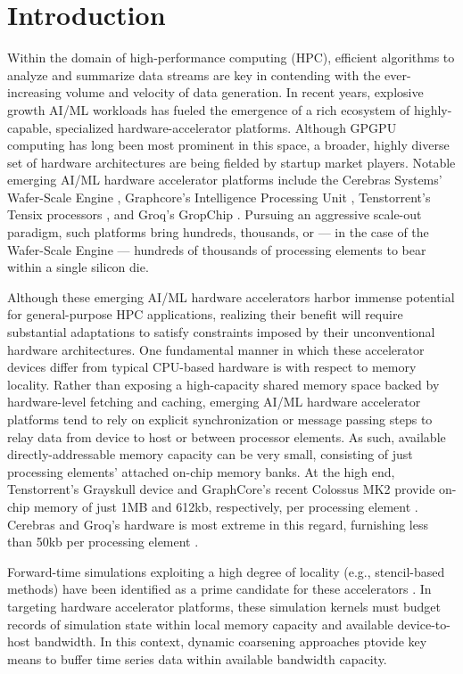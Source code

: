 \section{Introduction} \label{sec:introduction}

Within the domain of high-performance computing (HPC), efficient algorithms to analyze and summarize data streams are key in contending with the ever-increasing volume and velocity of data generation.
In recent years, explosive growth AI/ML workloads has fueled the emergence of a rich ecosystem of highly-capable, specialized hardware-accelerator platforms.
Although GPGPU computing has long been most prominent in this space, a broader, highly diverse set of hardware architectures are being fielded by startup market players.
Notable emerging AI/ML hardware accelerator platforms include the Cerebras Systems' Wafer-Scale Engine \citep{lie2023cerebras}, Graphcore's Intelligence Processing Unit \citep{gepner2024performance}, Tenstorrent's Tensix processors \citep{vasiljevic2021compute}, and Groq's GropChip \citep{abts2022groq}.
Pursuing an aggressive scale-out paradigm, such platforms bring hundreds, thousands, or --- in the case of the Wafer-Scale Engine --- hundreds of thousands of processing elements to bear within a single silicon die.

Although these emerging AI/ML hardware accelerators harbor immense potential for general-purpose HPC applications, realizing their benefit will require substantial adaptations to satisfy constraints imposed by their unconventional hardware architectures.
One fundamental manner in which these accelerator devices differ from typical CPU-based hardware is with respect to memory locality.
Rather than exposing a high-capacity shared memory space backed by hardware-level fetching and caching, emerging AI/ML hardware accelerator platforms tend to rely on explicit synchronization or message passing steps to relay data from device to host or between processor elements.
As such, available directly-addressable memory capacity can be very small, consisting of just processing elements' attached on-chip memory banks.
At the high end, Tenstorrent's Grayskull device and GraphCore's recent Colossus MK2 provide on-chip memory of just 1MB and 612kb, respectively, per processing element \citep{vasiljevic2021compute,gepner2024performance}.
Cerebras and Groq's hardware is most extreme in this regard, furnishing less than 50kb per processing element \citep{lie2023cerebras,abts2022groq}.

Forward-time simulations exploiting a high degree of locality (e.g., stencil-based methods) have been identified as a prime candidate for these accelerators \citep{jacquelin2022scalable,brown2023exploring,brown2024accelerating,louw2021using}.
In targeting hardware accelerator platforms, these simulation kernels must budget records of simulation state within local memory capacity and available device-to-host bandwidth.
In this context, dynamic coarsening approaches ptovide key means to buffer time series data within available bandwidth capacity.

